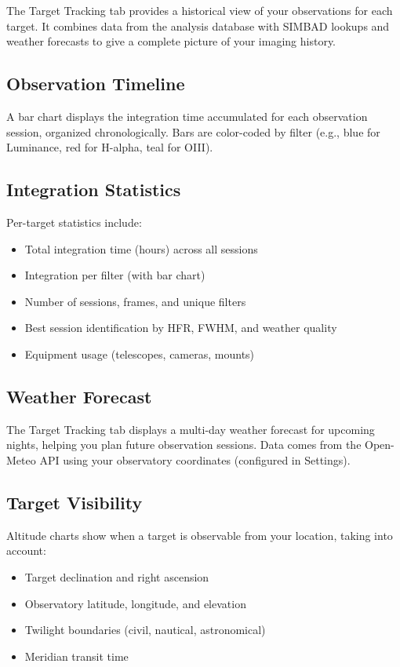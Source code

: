 \documentclass[11pt,a4paper]{article}
\begin{document}
The Target Tracking tab provides a historical view of your observations for each target. It combines data from the analysis database with SIMBAD lookups and weather forecasts to give a complete picture of your imaging history.

\subsection{Observation Timeline}

A bar chart displays the integration time accumulated for each observation session, organized chronologically. Bars are color-coded by filter (e.g., blue for Luminance, red for H-alpha, teal for OIII).

\subsection{Integration Statistics}

Per-target statistics include:
\begin{itemize}
    \item Total integration time (hours) across all sessions
    \item Integration per filter (with bar chart)
    \item Number of sessions, frames, and unique filters
    \item Best session identification by HFR, FWHM, and weather quality
    \item Equipment usage (telescopes, cameras, mounts)
\end{itemize}

\subsection{Weather Forecast}

The Target Tracking tab displays a multi-day weather forecast for upcoming nights, helping you plan future observation sessions. Data comes from the Open-Meteo API using your observatory coordinates (configured in Settings).

\subsection{Target Visibility}

Altitude charts show when a target is observable from your location, taking into account:
\begin{itemize}
    \item Target declination and right ascension
    \item Observatory latitude, longitude, and elevation
    \item Twilight boundaries (civil, nautical, astronomical)
    \item Meridian transit time
\end{itemize}
\end{document}
